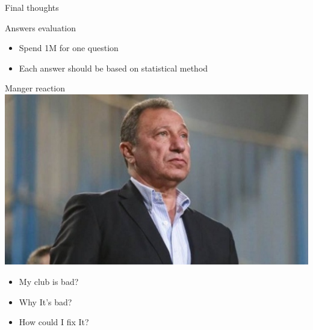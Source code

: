 \documentclass[8pt]{beamer}
\begin{document}
        \begin{frame}[t]{Final thoughts}
            \begin{block}{Answers evaluation}
                \pause
                \begin{itemize}
                    \item Spend 1M for one question\pause
                    \item Each answer should be based on statistical method\pause
                \end{itemize}
            \end{block}

            \begin{block}{Manger reaction}
                \includegraphics[height=.33\textheight]{pics/manger.jpg}\pause
                \begin{itemize}
                    \item My club is bad?\pause
                    \item Why It's bad?\pause
                    \item How could I fix It?
                \end{itemize}
            \end{block}
        \end{frame}
    
\end{document}
